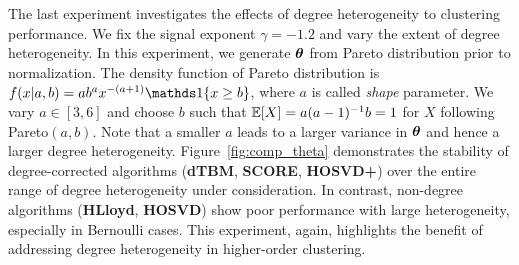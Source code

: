 \documentclass[lettersize,journal]{IEEEtran}
\theoremstyle{definition}
\theoremstyle{definition}
\begin{document}
The last experiment investigates the effects of degree heterogeneity to clustering performance. We fix the signal exponent $\gamma = -1.2$ and vary the extent of degree heterogeneity. In this experiment, we generate $\boldsymbol{\theta}$ from Pareto distribution prior to normalization. The density function of Pareto distribution is $f(x|a,b) = a b^a x^{-(a+1)} \ind\{ x \geq b \}$, where $a$ is called \emph{shape} parameter. We vary $a \in [3,6]$ and choose $b$ such that $\mathbb{E}[X] = a(a - 1)^{-1}b = 1$ for $X$ following Pareto$(a,b)$. Note that a smaller $a$ leads to a larger variance in $\boldsymbol{\theta}$ and hence a larger degree heterogeneity. Figure~\ref{fig:comp_theta} demonstrates the stability of degree-corrected algorithms (\textbf{\small dTBM}, \textbf{\small SCORE}, \textbf{\small HOSVD+}) over the entire range of degree heterogeneity under consideration. In contrast, non-degree algorithms (\textbf{\small HLloyd}, \textbf{\small HOSVD}) show poor performance with large heterogeneity, especially in Bernoulli cases. This experiment, again, highlights the benefit of addressing degree heterogeneity in higher-order clustering. 




\end{document}
